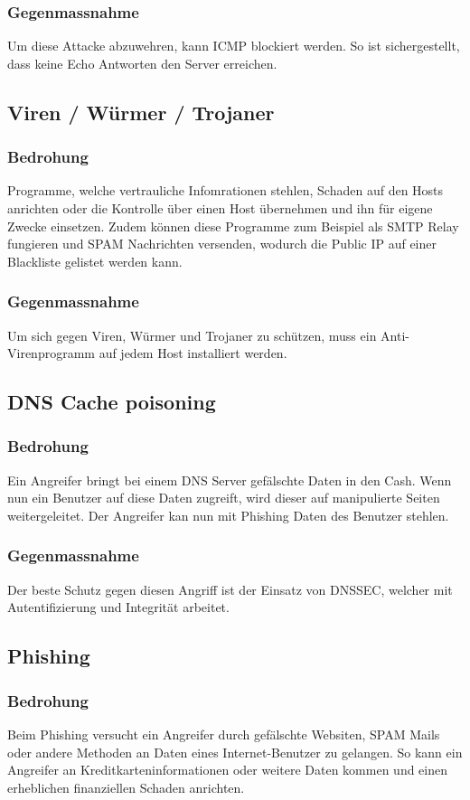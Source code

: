 \documentclass[11pt,a4paper,parskip=half]{scrartcl}
\begin{document}
\subsubsection{Gegenmassnahme}
Um diese Attacke abzuwehren, kann ICMP blockiert werden. So ist sichergestellt, dass keine Echo Antworten den Server erreichen.

\subsection{Viren / Würmer / Trojaner}
\subsubsection{Bedrohung}
Programme, welche vertrauliche Infomrationen stehlen, Schaden auf den Hosts anrichten oder die Kontrolle über einen Host übernehmen und ihn für eigene Zwecke einsetzen. Zudem können diese Programme zum Beispiel als SMTP Relay fungieren und SPAM Nachrichten versenden, wodurch die Public IP auf einer Blackliste gelistet werden kann.
\subsubsection{Gegenmassnahme}
Um sich gegen Viren, Würmer und Trojaner zu schützen, muss ein Anti-Virenprogramm auf jedem Host installiert werden.

\subsection{DNS Cache poisoning}
\subsubsection{Bedrohung}
Ein Angreifer bringt bei einem DNS Server gefälschte Daten in den Cash. Wenn nun ein Benutzer auf diese Daten zugreift, wird dieser auf manipulierte Seiten weitergeleitet. Der Angreifer kan nun mit Phishing Daten des Benutzer stehlen.

\subsubsection{Gegenmassnahme}
Der beste Schutz gegen diesen Angriff ist der Einsatz von DNSSEC, welcher mit Autentifizierung und Integrität arbeitet.
\subsection{Phishing}
\subsubsection{Bedrohung}
Beim Phishing versucht ein Angreifer durch gefälschte Websiten, SPAM Mails oder andere Methoden an Daten eines Internet-Benutzer zu gelangen. So kann ein Angreifer an Kreditkarteninformationen oder weitere Daten kommen und einen erheblichen finanziellen Schaden anrichten.
\end{document}
